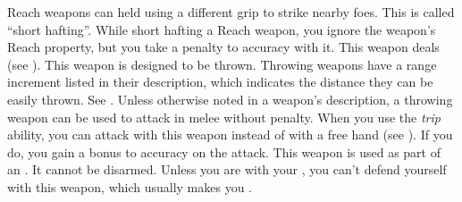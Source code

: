         Reach weapons can held using a different grip to strike nearby foes. This is called ``short hafting''. While short hafting a Reach weapon, you ignore the weapon's Reach property, but you take a  penalty to accuracy with it.
         This weapon deals  (see ).
         This weapon is designed to be thrown. Throwing weapons have a range increment listed in their description, which indicates the distance they can be easily thrown. See .
        Unless otherwise noted in a weapon's description, a throwing weapon can be used to attack in melee without penalty.
         When you use the \textit{trip} ability, you can attack with this weapon instead of with a free hand (see ).
        If you do, you gain a  bonus to accuracy on the attack.
         This weapon is used as part of an .
        It cannot be disarmed.
        Unless you are  with your , you can't defend yourself with this weapon, which usually makes you .

